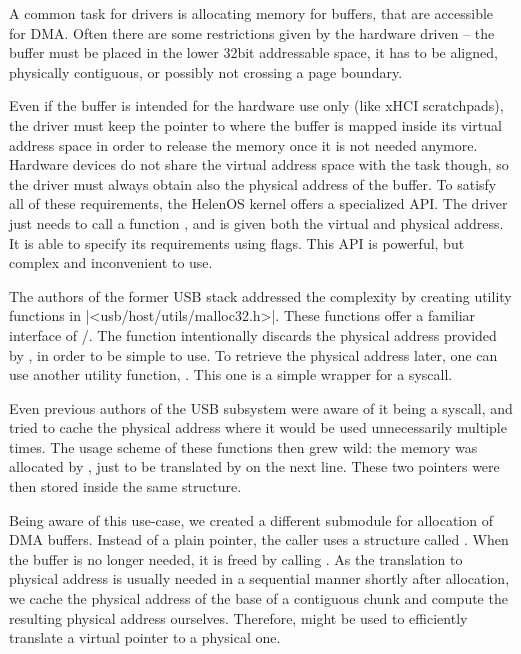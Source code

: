 A common task for drivers is allocating memory for buffers, that are accessible
for DMA. Often there are some restrictions given by the hardware driven -- the
buffer must be placed in the lower 32bit addressable space, it has to be
aligned, physically contiguous, or possibly not crossing a page boundary.

Even if the buffer is intended for the hardware use only (like xHCI
scratchpads), the driver must keep the pointer to where the buffer is mapped
inside its virtual address space in order to release the memory once it is not
needed anymore. Hardware devices do not share the virtual address space with
the task though, so the driver must always obtain also the physical address of
the buffer. To satisfy all of these requirements, the HelenOS kernel offers
a specialized API. The driver just needs to call a function
, and is given both the virtual and physical address. It
is able to specify its requirements using flags. This API is powerful, but
complex and inconvenient to use.

The authors of the former USB stack addressed the complexity by creating
utility functions in \header|<usb/host/utils/malloc32.h>|. These functions offer
a familiar interface of /. The  function
intentionally discards the physical address provided by
, in order to be simple to use. To retrieve the physical
address later, one can use another utility function, . This
one is a simple wrapper for a syscall.

Even previous authors of the USB subsystem were aware of it being a syscall,
and tried to cache the physical address where it would be used unnecessarily
multiple times. The usage scheme of these functions then grew wild: the memory
was allocated by , just to be translated by  on
the next line. These two pointers were then stored inside the same structure.

Being aware of this use-case, we created a different submodule for allocation
of DMA buffers. Instead of a plain pointer, the caller uses a structure called
. When the buffer is no longer needed, it is freed by
calling . As the translation to physical address is
usually needed in a sequential manner shortly after allocation, we cache the
physical address of the base of a contiguous chunk and compute the resulting
physical address ourselves. Therefore,  might be used to
efficiently translate a virtual pointer to a physical one.

